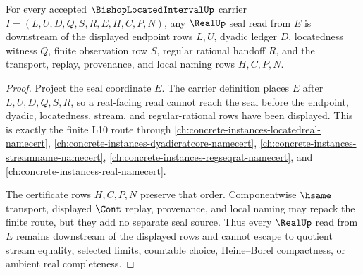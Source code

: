 \begin{theorem}
\label{thm:bishop-located-interval-real-seal-non-escape}
For every accepted $\BishopLocatedIntervalUp$ carrier $I=(L,U,D,Q,S,R,E,H,C,P,N)$, any $\RealUp$ seal read from $E$ is downstream of the displayed endpoint rows $L,U$, dyadic ledger $D$, locatedness witness $Q$, finite observation row $S$, regular rational handoff $R$, and the transport, replay, provenance, and local naming rows $H,C,P,N$.
\end{theorem}
\begin{proof}
Project the seal coordinate $E$. The carrier definition places $E$ after $L,U,D,Q,S,R$, so a real-facing read cannot reach the seal before the endpoint, dyadic, locatedness, stream, and regular-rational rows have been displayed. This is exactly the finite L10 route through \autoref{ch:concrete-instances-locatedreal-namecert}, \autoref{ch:concrete-instances-dyadicratcore-namecert}, \autoref{ch:concrete-instances-streamname-namecert}, \autoref{ch:concrete-instances-regseqrat-namecert}, and \autoref{ch:concrete-instances-real-namecert}.

The certificate rows $H,C,P,N$ preserve that order. Componentwise $\hsame$ transport, displayed $\Cont$ replay, provenance, and local naming may repack the finite route, but they add no separate seal source. Thus every $\RealUp$ read from $E$ remains downstream of the displayed rows and cannot escape to quotient stream equality, selected limits, countable choice, Heine--Borel compactness, or ambient real completeness.
\end{proof}


\begin{closurestatus}{\BishopLocatedIntervalUp}
  \theoryclosure{\obligationClosure}
  \formalstatus{\unformalizedV}
\end{closurestatus}
